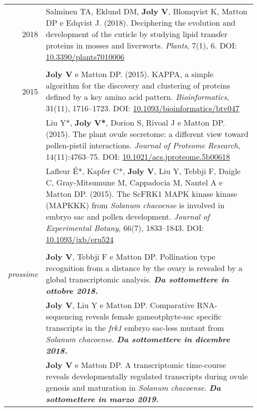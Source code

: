 \documentclass[letterpaper,12pt]{article}
\begin{document}
\begin{tabularx}{\textwidth}{@{}r|X@{}}

2018
& Salminen TA, Eklund DM, \textbf{Joly V}, Blomqvist K, Matton DP
  e Edqvist J. (2018).
  Deciphering the evolution and development of the cuticle by studying lipid
  transfer proteins in mosses and liverworts.
  \emph{Plants}, 7(1), 6.
  DOI: \href{http://doi.org/10.3390/plants7010006}{10.3390/plants7010006}
  \\

\multicolumn{2}{c}{} \\

2015
& \textbf{Joly V} e Matton DP. (2015).
  KAPPA, a simple algorithm for the discovery and clustering of proteins defined
  by a key amino acid pattern.
  \emph{Bioinformatics}, 31(11), 1716--1723.
  DOI: \href{http://doi.org/10.1093/bioinformatics/btv047}
  {10.1093/bioinformatics/btv047}
  \vspace{3mm}
  \\

& Liu Y*, \textbf{Joly V*}, Dorion S, Rivoal J e Matton DP. (2015).
  The plant ovule secretome: a different view toward pollen-pistil interactions.
  \emph{Journal of Proteome Research}, 14(11):4763--75.
  DOI: \href{http://doi.org/10.1021/acs.jproteome.5b00618}
  {10.1021/acs.jproteome.5b00618}
  \vspace{3mm}
  \\

& Lafleur É*, Kapfer C*, \textbf{Joly V}, Liu Y, Tebbji F, Daigle C,
  Gray-Mitsumune M, Cappadocia M, Nantel A e Matton DP. (2015).
  The ScFRK1 MAPK kinase kinase (MAPKKK) from \emph{Solanum chacoense} is
  involved in embryo sac and pollen development.
  \emph{Journal of Experimental Botany}, 66(7), 1833--1843.
  DOI: \href{http://doi.org/10.1093/jxb/eru524}{10.1093/jxb/eru524}
  \\

\multicolumn{2}{c}{} \\

{\em prossime}
& \textbf{Joly V}, Tebbji F e Matton DP.
  Pollination type recognition from a distance by the ovary is revealed by a
  global transcriptomic analysis.
  {\bfseries\em Da sottomettere in ottobre 2018.}
  \vspace{3mm}
  \\

& \textbf{Joly V}, Liu Y e Matton DP.
  Comparative RNA-sequencing reveals female gameotphyte-sac specific transcripts
  in the \emph{frk1} embryo sac-less mutant from \emph{Solanum chacoense}.
  {\bfseries\em Da sottomettere in dicembre 2018.}
  \vspace{3mm}
  \\

& \textbf{Joly V} e Matton DP.
  A transcriptomic time-course reveals developmentally regulated transcripts
  during ovule genesis and maturation in \emph{Solanum chacoense}.
  {\bfseries\em Da sottomettere in marzo 2019.} \\

\end{tabularx}
\end{document}
